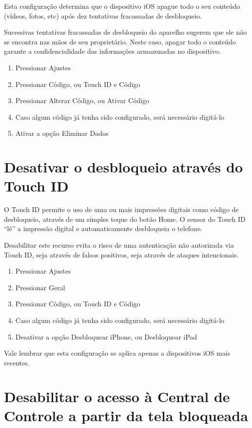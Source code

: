Esta configura\c c\~ao determina que o dispositivo iOS apague todo o seu conte\'udo (v\'ideos, fotos, etc) ap\'os dez tentativas fracassadas de desbloqueio.

Sucessivas tentativas fracassadas de desbloqueio do aparelho sugerem que ele n\~ao se encontra nas m\~aos de seu propriet\'ario. Neste caso, apagar todo o conte\'udo garante a confidencialidade das informa\c c\~oes armazenadas no dispositivo.

\begin{enumerate}
\item Pressionar Ajustes
\item Pressionar C\'odigo, ou Touch ID e C\'odigo
\item Pressionar Alterar C\'odigo, ou Ativar C\'odigo
\item Caso algum c\'odigo j\'a tenha sido configurado, ser\'a necess\'ario digit\'a-lo
\item Ativar a op\c c\~ao Eliminar Dados
\end{enumerate}

\section{Desativar o desbloqueio atrav\'es do Touch ID}

O Touch ID permite o uso de uma ou mais impress\~oes digitais como c\'odigo de desbloqueio, atrav\'es de um simples toque do bot\~ao Home. O sensor do Touch ID ``l\^e'' a impress\~ao digital e automaticamente desbloqueia o telefone.

Desabilitar este recurso evita o risco de uma autentica\c c\~ao n\~ao autorizada via Touch ID, seja atrav\'es de falsos positivos, seja atrav\'es de ataques intencionais. 

\begin{enumerate}
\item Pressionar Ajustes
\item Pressionar Geral
\item Pressionar C\'odigo, ou Touch ID e C\'odigo
\item Caso algum c\'odigo j\'a tenha sido configurado, ser\'a necess\'ario digit\'a-lo
\item Desativar a op\c c\~ao Desbloquear iPhone, ou Desbloquear iPad
\end{enumerate}

Vale lembrar que esta configura\c c\~ao se aplica apenas a dispositivos iOS mais recentes.

\section{Desabilitar o acesso \`a Central de Controle a partir da tela bloqueada}

